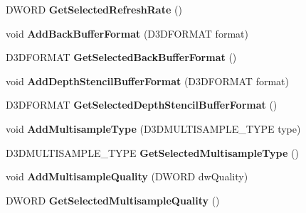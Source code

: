 \begin{DoxyCompactItemize}
\item 
\hypertarget{class_c_d3_d_settings_dlg_ab2c395b2c12a94c6491d4639617fe1ac}{D\+W\+O\+R\+D {\bfseries Get\+Selected\+Refresh\+Rate} ()}\label{class_c_d3_d_settings_dlg_ab2c395b2c12a94c6491d4639617fe1ac}

\item 
\hypertarget{class_c_d3_d_settings_dlg_a8794267a14a02e711dca155c2cfc4290}{void {\bfseries Add\+Back\+Buffer\+Format} (D3\+D\+F\+O\+R\+M\+A\+T format)}\label{class_c_d3_d_settings_dlg_a8794267a14a02e711dca155c2cfc4290}

\item 
\hypertarget{class_c_d3_d_settings_dlg_a22cb29162c256ff8017867c0f66a404f}{D3\+D\+F\+O\+R\+M\+A\+T {\bfseries Get\+Selected\+Back\+Buffer\+Format} ()}\label{class_c_d3_d_settings_dlg_a22cb29162c256ff8017867c0f66a404f}

\item 
\hypertarget{class_c_d3_d_settings_dlg_afd377864abb5683285ec335fe6011c7a}{void {\bfseries Add\+Depth\+Stencil\+Buffer\+Format} (D3\+D\+F\+O\+R\+M\+A\+T format)}\label{class_c_d3_d_settings_dlg_afd377864abb5683285ec335fe6011c7a}

\item 
\hypertarget{class_c_d3_d_settings_dlg_a39ae16cb2d2b7f839e1adf6a982a6d19}{D3\+D\+F\+O\+R\+M\+A\+T {\bfseries Get\+Selected\+Depth\+Stencil\+Buffer\+Format} ()}\label{class_c_d3_d_settings_dlg_a39ae16cb2d2b7f839e1adf6a982a6d19}

\item 
\hypertarget{class_c_d3_d_settings_dlg_a13d7360f5233781dbb2dea92d30a2257}{void {\bfseries Add\+Multisample\+Type} (D3\+D\+M\+U\+L\+T\+I\+S\+A\+M\+P\+L\+E\+\_\+\+T\+Y\+P\+E type)}\label{class_c_d3_d_settings_dlg_a13d7360f5233781dbb2dea92d30a2257}

\item 
\hypertarget{class_c_d3_d_settings_dlg_a2789ede2956d2a0e5fa489f4a9ef690c}{D3\+D\+M\+U\+L\+T\+I\+S\+A\+M\+P\+L\+E\+\_\+\+T\+Y\+P\+E {\bfseries Get\+Selected\+Multisample\+Type} ()}\label{class_c_d3_d_settings_dlg_a2789ede2956d2a0e5fa489f4a9ef690c}

\item 
\hypertarget{class_c_d3_d_settings_dlg_aecef3b988a7dd637e0a8dece0bd23bc9}{void {\bfseries Add\+Multisample\+Quality} (D\+W\+O\+R\+D dw\+Quality)}\label{class_c_d3_d_settings_dlg_aecef3b988a7dd637e0a8dece0bd23bc9}

\item 
\hypertarget{class_c_d3_d_settings_dlg_a74ce21d607ccf9071bc6e6bf8a8bde51}{D\+W\+O\+R\+D {\bfseries Get\+Selected\+Multisample\+Quality} ()}\label{class_c_d3_d_settings_dlg_a74ce21d607ccf9071bc6e6bf8a8bde51}


\end{DoxyCompactItemize}
